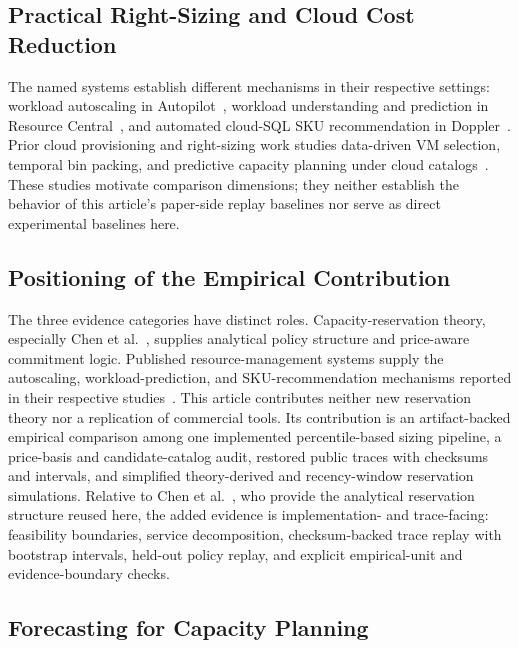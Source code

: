 \documentclass[11pt]{article}
\begin{document}
\subsection{Practical Right-Sizing and Cloud Cost Reduction}

The named systems establish different mechanisms in their respective
settings: workload autoscaling in Autopilot~\cite{rzadca2020autopilot},
workload understanding and prediction in Resource
Central~\cite{cortez2017resource}, and automated cloud-SQL SKU recommendation
in Doppler~\cite{cahoon2022doppler}. Prior cloud provisioning and
right-sizing work studies data-driven VM selection, temporal bin packing, and
predictive capacity planning under cloud
catalogs~\cite{yadwadkar2017paris,aydin2020binpacking,alves2025iaas,musa2024costeffective}.
These studies motivate comparison dimensions; they neither establish the
behavior of this article's paper-side replay baselines nor serve as direct
experimental baselines here.

\subsection{Positioning of the Empirical Contribution}

The three evidence categories have distinct roles. Capacity-reservation
theory, especially Chen et al.~\cite{chen2024capacity}, supplies analytical
policy structure and price-aware commitment logic. Published
resource-management systems supply the autoscaling, workload-prediction, and
SKU-recommendation mechanisms reported in their respective
studies~\cite{rzadca2020autopilot,cortez2017resource,cahoon2022doppler}.
This article contributes neither new reservation theory nor a replication of
commercial tools. Its contribution is an artifact-backed empirical comparison
among one implemented percentile-based sizing pipeline, a price-basis and
candidate-catalog audit, restored public traces with checksums and intervals,
and simplified theory-derived and recency-window reservation simulations.
Relative to Chen et al.~\cite{chen2024capacity}, who provide the analytical
reservation structure reused here, the added evidence is implementation- and
trace-facing: feasibility boundaries, service decomposition, checksum-backed
trace replay with bootstrap intervals, held-out policy replay, and explicit
empirical-unit and evidence-boundary checks.

\subsection{Forecasting for Capacity Planning}
\end{document}
